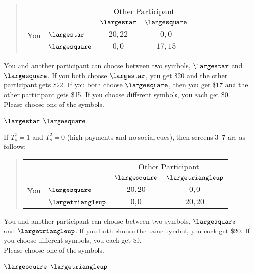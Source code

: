 \documentclass[11pt]{article}
\begin{document}
\begin{tcolorbox}
\begin{quote}
\begin{center}
\begin{tabular}{llcc}
    & & \multicolumn{2}{c}{Other Participant}  \\
& & $\largestar$ & $\largesquare$  \\ \cline{3-4}
You & $\largestar$ & \multicolumn{1}{|c|}{$20,22$} & \multicolumn{1}{c|}{$0,0$}  \\ \cline{3-4}
& $\largesquare$ & \multicolumn{1}{|c|}{$0,0$} & \multicolumn{1}{c|}{$17,15$}  \\ \cline{3-4}
\end{tabular}
\end{center}
\end{quote}

You and another participant can choose between two symbols, $\largestar$ and $\largesquare$. If you both choose $\largestar$, you get \$20 and the other participant gets \$22. If you both choose $\largesquare$, then you get \$17 and the other participant gets \$15. If you choose different symbols, you each get \$0.\\

Please choose one of the symbols.\\


\begin{center}
$\largestar$ \qquad $\largesquare$
\end{center}
\end{tcolorbox}


If $T_s^1=1$ and $T_s^2=0$ (high payments and no social cues), then screens 3--7 are as follows:
\begin{tcolorbox}
\begin{quote}
\begin{center}
\begin{tabular}{llcc}
    & & \multicolumn{2}{c}{Other Participant}  \\
  &  & $\largesquare$ & $\largetriangleup$  \\ \cline{3-4}
 You & $\largesquare$ & \multicolumn{1}{|c|}{$20,20$} & \multicolumn{1}{c|}{$0,0$}  \\ \cline{3-4}
  & $\largetriangleup$ & \multicolumn{1}{|c|}{$0,0$} & \multicolumn{1}{c|}{$20,20$}  \\ \cline{3-4}
\end{tabular}
\end{center}
\end{quote}

You and another participant can choose between two symbols, $\largesquare$ and $\largetriangleup$. If you both choose the same symbol, you each get \$20. If you choose different symbols, you each get \$0.\\

Please choose one of the symbols.\\

\begin{center}
$\largesquare$ \qquad $\largetriangleup$
\end{center}
\end{tcolorbox}
\end{document}
